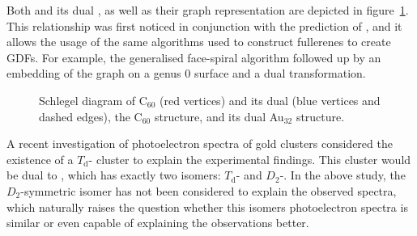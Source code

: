 Both  and its dual , as well as their graph representation are
depicted in figure~\ref{fig:C60dual}. This relationship was first noticed in
conjunction with the prediction of
,\autocite{Johansson_Au3224CaratGolden_2004} and it allows the usage of
the same algorithms used to construct fullerenes to create \acp{GDF}. For
example, the generalised face-spiral
algorithm\autocite{Fowler-atlas-2006,Schwerdtfeger_Programfullerenesoftware_2013,Wirz-2014,Schwerdtfeger_topologyfullerenes_2015}
followed up by an embedding of the graph on a genus 0 surface and a dual
transformation.
%
\begin{figure}[htb]
    \begin{center}
        \hspace{0.05\textwidth}
        \hspace{0.034\textwidth}
        \caption{\protect{} Schlegel diagram of C$_{60}$ (red
        vertices) and its dual (blue vertices and dashed edges),
        \protect{} the C$_{60}$ structure, and
        \protect{} its dual Au$_{32}$ structure.}
    \label{fig:C60dual}
    \end{center}
\end{figure}
%
A recent investigation of photoelectron spectra of gold clusters considered the
existence of a $T_\text{d}$- cluster to explain the experimental
findings.\autocite{Bulusu_Evidencehollowgolden_2006} This cluster would be dual
to , which has exactly two isomers: $T_\text{d}$- and
$D_2$-. In the above study, the $D_2$-symmetric isomer has not been
considered to explain the observed spectra, which naturally raises the question
whether this isomers photoelectron spectra is similar or even capable of
explaining the observations better. 

